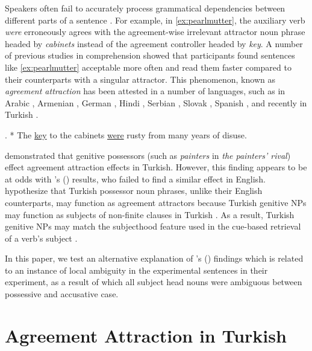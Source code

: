 \documentclass[apacite,linguex]{glossa}\usepackage[]{graphicx}\usepackage[]{color}
\begin{document}
Speakers often fail to accurately process grammatical dependencies between different parts of a sentence \citep[e.g.,][]{GibsonThomas:1999,PhillipsEtAl:2011}. For example, in \ref{ex:pearlmutter}, the auxiliary verb \textit{were} erroneously agrees with the agreement-wise irrelevant attractor noun phrase headed by \textit{cabinets} instead of the agreement controller headed by \textit{key}. A number of previous studies in comprehension \citep{NicolEtAl:1997, PearlmutterGarnseyBock:1999, WagersEtAl:2009} showed that participants found sentences like \ref{ex:pearlmutter} acceptable more often and read them faster compared to their counterparts with a singular attractor. This phenomenon, known as \textit{agreement attraction} \citep{BockMiller:1991} has been attested in a number of languages, such as in Arabic \citep{TuckerEtAl:2015}, Armenian \citep{AvetisyanEtAl:2020}, German \citep{LagoFelser:2018}, Hindi \citep{BhatiaDillon:2020}, Serbian \citep{RisticEtAl:2016}, Slovak \citep{BadeckerKuminiak:2007}, Spanish \citep{LagoEtAl:2015}, and recently in Turkish \citep{LagoEtAl:2019}.


\ex. \label{ex:pearlmutter} * The \underline{key} to the cabinets \underline{were} rusty from many years of disuse. 


\citet{LagoEtAl:2019} demonstrated that genitive possessors (such as \textit{painters} in \textit{the painters' rival}) effect agreement attraction effects in Turkish. However, this finding appears to be at odds with \citeauthor{NicolEtAl:2016}'s (\citeyear{NicolEtAl:2016}) results, who failed to find a similar effect in English. \citet{LagoEtAl:2019} hypothesize that Turkish possessor noun phrases, unlike their English counterparts, may function as agreement attractors because Turkish genitive NPs may function as subjects of non-finite clauses in Turkish \citep{GokselKerslake:2005,Kornfilt:2011}. As a result, Turkish genitive NPs may match the subjecthood feature used in the cue-based retrieval of a verb's subject \citep{LewisVasishth:2005, WagersEtAl:2009, ArnettWagers:2017}.

In this paper, we test an alternative explanation of \citeauthor{LagoEtAl:2019}'s (\citeyear{LagoEtAl:2019}) findings which is related to an instance of local ambiguity in the experimental sentences in their experiment, as a result of which all subject head nouns were ambiguous between possessive and accusative case.


\section{Agreement Attraction in Turkish}
\end{document}
